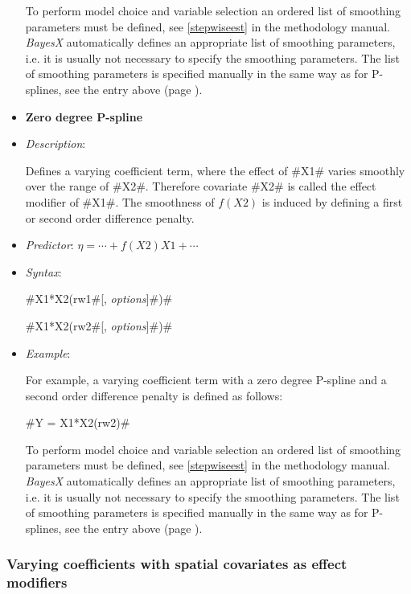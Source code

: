 \begin{itemize}
To perform model choice and variable selection an ordered list of smoothing
parameters must be defined, see \autoref{stepwiseest}
in the methodology manual. {\em BayesX} automatically defines an appropriate
list of smoothing parameters, i.e. it
is usually not necessary to  specify the smoothing parameters.
The list of smoothing parameters is specified manually in the same way as for P-splines,
see the entry above (page \pageref{psplines_stepwise}).


\item[]{\bf\sffamily Zero degree P-spline}

\item[] {\em Description}:

Defines a varying coefficient term, where the effect of #X1#
varies smoothly over the range of #X2#. Therefore covariate #X2#
is called the effect modifier of #X1#. The smoothness of $f(X2)$ is
induced by defining a first or second order difference penalty.

\item[] {\em Predictor}:
$\eta= \cdots + f(X2)X1 + \cdots$ \item[] {\em Syntax}:

#X1*X2(rw1#[, {\em options}]#)#

#X1*X2(rw2#[, {\em options}]#)#
\item[] {\em Example}:

For example, a varying coefficient term with a zero degree P-spline and a second order difference
penalty is defined as follows:

#Y = X1*X2(rw2)#


To perform model choice and variable selection an ordered list of smoothing parameters must be defined, see
\autoref{stepwiseest} in the methodology manual. {\em BayesX} automatically defines an appropriate list of smoothing
parameters, i.e. it is usually not necessary to  specify the smoothing parameters. The list of smoothing parameters is
specified manually in the same way as for P-splines, see the entry above (page \pageref{psplines_stepwise}).

\end{itemize}

\subsubsection*{ Varying coefficients with spatial covariates as
effect modifiers}


